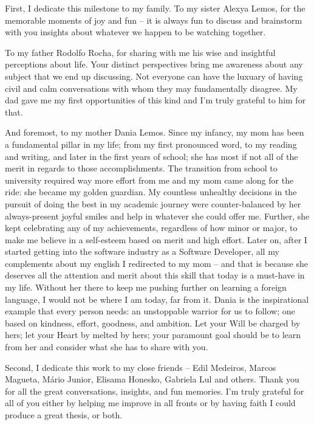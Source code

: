 First, I dedicate this milestone to my family. To my sister Alexya Lemos, for the memorable moments of joy and fun -- it is always fun to
discuss and brainstorm with you insights about whatever we happen to be watching together.

To my father Rodolfo Rocha, for sharing with me his wise and insightful perceptions about life.
Your distinct perspectives bring me awareness about any subject that we end up
discussing. Not everyone can have the luxuary of having
civil and calm conversations with whom they may fundamentally disagree. My dad gave me my first
opportunities of this kind and I'm truly grateful to him for that.

And foremost, to my mother Dania Lemos. Since my infancy, my mom has been a fundamental pillar in my life;
from my first pronounced word, to my reading and writing, and later in the first years of school; she has most if not
all of the merit in regards to those accomplishments. The transition from school to university required way more effort
from me and my mom came along for the ride: she became my golden guardian. My countless unhealthy decisions in the pursuit
of doing the best in my academic journey were counter-balanced by her always-present joyful smiles and help in whatever
she could offer me. Further, she kept celebrating any of my achievements, regardless of how minor or major, to make me
believe in a self-esteem based on merit and high effort. Later on, after I started getting into the software industry
as a Software Developer, all my complements about my english I redirected to my mom -- and that is because she deserves
all the attention and merit about this skill that today is a must-have in my life. Without her there to keep me pushing
further on learning a foreign language, I would not be where I am today, far from it. Dania is the inspirational example that every
person needs: an unstoppable warrior for us to follow; one based on kindness, effort, goodness, and ambition. Let your Will
be charged by hers; let your Heart by melted by hers; your paramount goal should be to learn from her and consider what
she has to share with you.

Second, I dedicate this work to my close friends -- Edil Medeiros, Marcos Magueta, Mário Junior, Elisama Honesko, Gabriela Lul and others. Thank you for
all the great conversations, insights, and fun memories. I'm truly grateful for all of you either by helping me improve in all
fronts or by having faith I could produce a great thesis, or both.
